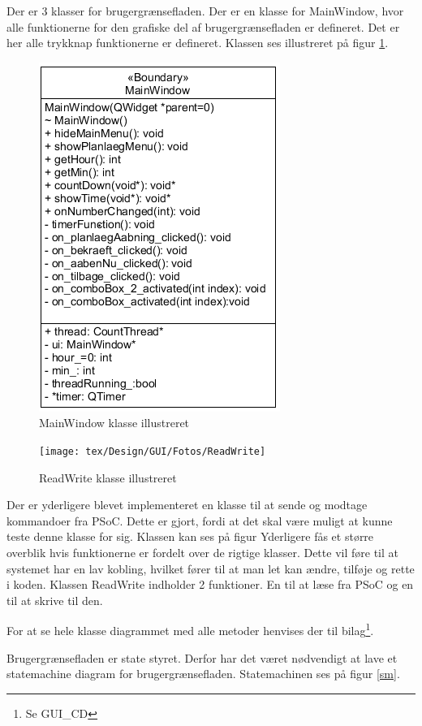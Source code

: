 Der er 3 klasser for brugergrænsefladen. Der er en klasse for MainWindow, hvor alle funktionerne for den grafiske del af brugergrænsefladen er defineret.  Det er her alle trykknap funktionerne er defineret. Klassen ses illustreret på figur \ref{MW_CD}. 

\begin{figure}[H]
	\centerline{\includegraphics[scale=1]{tex/Design/GUI/Fotos/MainWindow}}
	\caption{MainWindow klasse illustreret}
	\label{MW_CD}
\end{figure}

\begin{figure}[H]
	\centerline{\texttt{[image: tex/Design/GUI/Fotos/ReadWrite]}}
	\caption{ReadWrite klasse illustreret}
	\label{RW_CD}
\end{figure}
Der er yderligere blevet implementeret en klasse til at sende og modtage kommandoer fra PSoC. Dette er gjort, fordi at det skal være muligt at kunne teste denne klasse for sig.
Klassen kan ses på figur \label{RW_CD} Yderligere fås et større overblik hvis funktionerne er fordelt over de rigtige klasser. Dette vil føre til at systemet har en lav kobling, hvilket fører til at man let kan ændre, tilføje og rette i koden. Klassen ReadWrite indholder 2 funktioner. En til at læse fra PSoC og en til at skrive til den.

For at se hele klasse diagrammet med alle metoder henvises der til bilag\footnote{Se GUI\_CD}.

Brugergrænsefladen er state styret. Derfor har det været nødvendigt at lave et statemachine diagram for brugergrænsefladen. Statemachinen ses på figur \ref{sm}.\\


